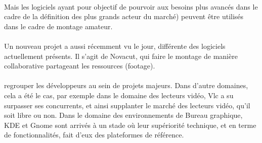 
\paragraph {}

Mais les logiciels ayant pour objectif de pourvoir aux besoins plus
avancés %
dans le cadre de la définition des plus grands acteur du marché)
peuvent être utilisés dans le cadre de montage amateur.

\paragraph{}

Un nouveau projet a aussi récemment vu le jour, %
différente des logiciels actuellement présents. Il s'agit de Novacut,
qui %
faire le montage de manière collaborative %
partageant les ressources (footage).

\paragraph{}

regrouper les développeurs au sein de projets majeurs. Dans d'autre
domaines, cela a été le cas, par exemple dans le domaine des lecteurs
vidéo, Vlc a su surpasser ses concurrents, et ainsi supplanter le
marché des lecteurs vidéo, qu'il soit libre ou non. Dans le domaine
des environnements de Bureau graphique, KDE et Gnome sont arrivés à un
stade où leur supériorité technique, et en terme de fonctionnalités,
fait d'eux des plateformes de référence.

